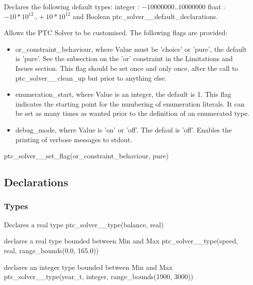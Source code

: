 \documentclass{article}
\begin{document}
    {Declares the following default types:
    integer : $-10 000 000..10 000 000$
        float : $-10*10^{12} .. +10*10^{12}$
    and Boolean}
    {ptc\_solver\_\_default\_declarations.}
    {}

    {Allows the PTC Solver to be customised. The following flags are
provided:
     \begin{itemize}
      \item {or\_constraint\_behaviour}, where Value must be 'choice' or 'pure',
the default is 'pure'.
      See the subsection on the 'or' constraint in the Limitations and Issues
section. This flag should be set once and only once, after the call to ptc\_solver\_\_clean\_up but prior to anything else.
      \item enumeration\_start, where Value is an integer, the default is 1. This flag indicates the starting point for the numbering of enumeration literals. It can be set as many times as wanted prior to the definition of an enumerated type.
      \item debug\_mode, where Value is 'on' or 'off'. The defaul is 'off'. Enables the printing of verbose messages to stdout. 
     \end{itemize}
     }
    {ptc\_solver\_\_set\_flag(or\_constraint\_behaviour, pure)}
    {}

\subsection{Declarations}

\subsubsection{Types}

\hspace{\parindent}
        {Declares a real type}
        {ptc\_solver\_\_type(balance, real)}
        {}

        {declares a real type bounded between Min and Max}
        {ptc\_solver\_\_type(speed, real, range\_bounds(0.0, 165.0))}
        {}

        {declares an integer type bounded between Min and Max}
        {ptc\_solver\_\_type(year\_t, integer, range\_bounds(1900, 3000))}
        {}
\end{document}
